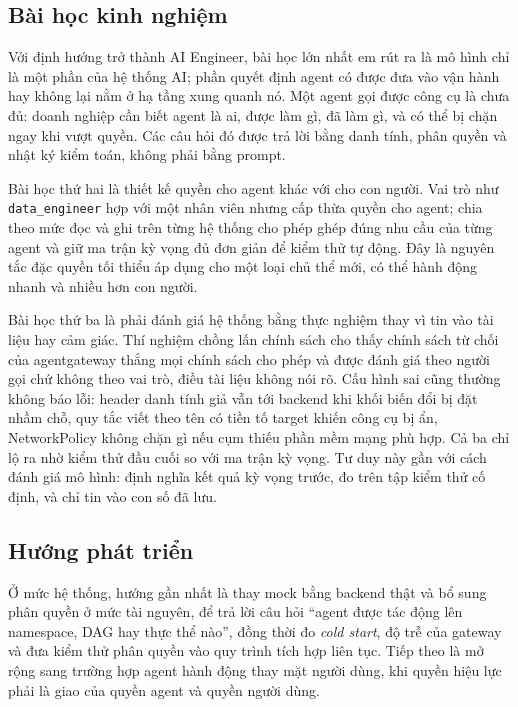 \documentclass[a4paper]{article}
\begin{document}
\subsection{Bài học kinh nghiệm}

Với định hướng trở thành AI Engineer, bài học lớn nhất em rút ra là mô hình chỉ là một phần của hệ thống AI; phần quyết định agent có được đưa vào vận hành hay không lại nằm ở hạ tầng xung quanh nó. Một agent gọi được công cụ là chưa đủ: doanh nghiệp cần biết agent là ai, được làm gì, đã làm gì, và có thể bị chặn ngay khi vượt quyền. Các câu hỏi đó được trả lời bằng danh tính, phân quyền và nhật ký kiểm toán, không phải bằng prompt.

Bài học thứ hai là thiết kế quyền cho agent khác với cho con người. Vai trò như \texttt{data\_engineer} hợp với một nhân viên nhưng cấp thừa quyền cho agent; chia theo mức đọc và ghi trên từng hệ thống cho phép ghép đúng nhu cầu của từng agent và giữ ma trận kỳ vọng đủ đơn giản để kiểm thử tự động. Đây là nguyên tắc đặc quyền tối thiểu áp dụng cho một loại chủ thể mới, có thể hành động nhanh và nhiều hơn con người.

Bài học thứ ba là phải đánh giá hệ thống bằng thực nghiệm thay vì tin vào tài liệu hay cảm giác. Thí nghiệm chồng lấn chính sách cho thấy chính sách từ chối của agentgateway thắng mọi chính sách cho phép và được đánh giá theo người gọi chứ không theo vai trò, điều tài liệu không nói rõ. Cấu hình sai cũng thường không báo lỗi: header danh tính giả vẫn tới backend khi khối biến đổi bị đặt nhầm chỗ, quy tắc viết theo tên có tiền tố target khiến công cụ bị ẩn, NetworkPolicy không chặn gì nếu cụm thiếu phần mềm mạng phù hợp. Cả ba chỉ lộ ra nhờ kiểm thử đầu cuối so với ma trận kỳ vọng. Tư duy này gần với cách đánh giá mô hình: định nghĩa kết quả kỳ vọng trước, đo trên tập kiểm thử cố định, và chỉ tin vào con số đã lưu.

\subsection{Hướng phát triển}

Ở mức hệ thống, hướng gần nhất là thay mock bằng backend thật và bổ sung phân quyền ở mức tài nguyên, để trả lời câu hỏi ``agent được tác động lên namespace, DAG hay thực thể nào'', đồng thời đo \textit{cold start}, độ trễ của gateway và đưa kiểm thử phân quyền vào quy trình tích hợp liên tục. Tiếp theo là mở rộng sang trường hợp agent hành động thay mặt người dùng, khi quyền hiệu lực phải là giao của quyền agent và quyền người dùng.
\end{document}
